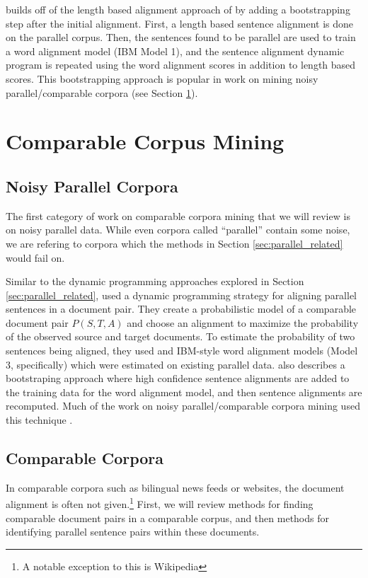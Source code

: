 \citet{Moore02} builds off of the length based alignment approach of
\citet{Gale93} by adding a bootstrapping step after the initial alignment.
First, a length based sentence alignment is done on the parallel corpus. Then,
the sentences found to be parallel are used to train a word alignment model
(IBM Model 1), and the sentence alignment dynamic program is repeated using
the word alignment scores in addition to length based scores. This bootstrapping
approach is popular in work on mining noisy parallel/comparable corpora (see
Section \ref{sec:comparable_related}).

\section{Comparable Corpus Mining}
\label{sec:comparable_related}

\subsection{Noisy Parallel Corpora}
\label{sec:noisy_related}
The first category of work on comparable corpora mining that we will review is
on noisy parallel data. While even corpora called ``parallel'' contain some
noise, we are refering to corpora which the methods in Section
\ref{sec:parallel_related} would fail on.

Similar to the dynamic programming approaches explored in Section
\ref{sec:parallel_related}, \citet{Zhao02} used a dynamic programming strategy
for aligning parallel sentences in a document pair. They create a probabilistic
model of a comparable document pair $P(S,T,A)$ and choose an alignment to
maximize the probability of the observed source and target documents. To
estimate the probability of two sentences being aligned, they used and IBM-style 
word alignment models (Model 3, specifically) which were estimated on existing
parallel data. \citet{Zhao02} also describes a bootstraping approach where high
confidence sentence alignments are added to the training data for the word
alignment model, and then sentence alignments are recomputed. Much of the work
on noisy parallel/comparable corpora mining used this technique 
\citep{Fung04a,Fung04b,Wu05,Munteanu05}.

\subsection{Comparable Corpora}
\label{sec:nonnoisy_related}
In comparable corpora such as bilingual news feeds or websites, the document
alignment is often not given.\footnote{A notable exception to this is Wikipedia}
First, we will review methods for finding comparable document pairs in a
comparable corpus, and then methods for identifying parallel sentence pairs
within these documents.

